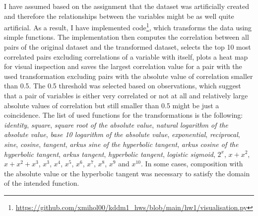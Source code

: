 \documentclass[a4paper,10pt]{article}\setlength{\textheight}{10in}\setlength{\textwidth}{6.5in}\setlength{\topmargin}{-0.125in}\setlength{\oddsidemargin}{-.2in}\setlength{\evensidemargin}{-.2in}\setlength{\headsep}{0.2in}\setlength{\footskip}{0pt}\usepackage{amsmath}\usepackage{fancyhdr}\usepackage{enumitem}\usepackage{hyperref}\usepackage{xcolor}\usepackage{graphicx}\pagestyle{fancy}
\begin{document}
\begin{enumerate}[topsep=0mm, partopsep=0mm, leftmargin=*]
I have assumed based on the assignment that the dataset was artificially created and therefore the relationships between the variables might be as well quite artificial. As a result, I have implemented code\footnote{\url{https://github.com/xmihol00/kddm1_hws/blob/main/hw1/visualisation.py}}, which transforms the data using simple functions. The implementation then computes the correlation between all pairs of the original dataset and the transformed dataset, selects the top 10 most correlated pairs excluding correlations of a variable with itself, plots a heat map for visual inspection and saves the largest correlation value for a pair with the used transformation excluding pairs with the absolute value of correlation smaller than 0.5. The 0.5 threshold was selected based on observations, which suggest that a pair of variables is either very correlated or not at all and relatively large absolute values of correlation but still smaller than 0.5 might be just a coincidence. The list of used functions for the transformations is the following: \textit{identity}, \textit{square}, \textit{square root of the absolute value}, \textit{natural logarithm of the absolute value}, \textit{base 10 logarithm of the absolute value}, \textit{exponential}, \textit{reciprocal}, \textit{sine}, \textit{cosine}, \textit{tangent}, \textit{arkus sine of the hyperbolic tangent}, \textit{arkus cosine of the hyperbolic tangent}, \textit{arkus tangent}, \textit{hyperbolic tangent}, \textit{logistic sigmoid}, $2^x$, $x + x^2$, $x + x^2 + x^3$, $x^3$, $x^4$, $x^5$, $x^6$, $x^7$, $x^8$, $x^9$ and $x^{10}$. In some cases, composition with the absolute value or the hyperbolic tangent was necessary to satisfy the domain of the intended function. 


\end{enumerate}
\end{document}
